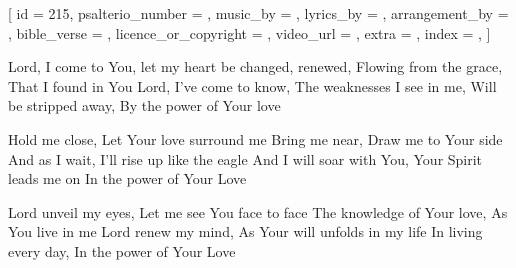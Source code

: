 
[
    id = {215},
    psalterio_number = {},
    music_by = {},
    lyrics_by = {},
    arrangement_by = {},
    bible_verse = {},
    licence_or_copyright = {},
    video_url = {},
    extra = {},
    index = {},
]


\beginverse
	
Lord, I come to You, let my heart be changed, renewed,
Flowing from the grace, 
That I found in You
Lord, I've come to know,
 The weaknesses I see in me,
Will be stripped away, 
By the power of Your love

\endverse


\beginchorus

Hold me close, 
Let Your love surround me
Bring me near, Draw me to Your side
And as I wait, I'll rise up like the eagle
And I will soar with You, 
Your Spirit leads me on
In the power of Your Love

\endchorus


\beginverse

\chordsoff
Lord unveil my eyes,
 Let me see You face to face
The knowledge of Your love, 
As You live in me
Lord renew my mind,
 As Your will unfolds in my life
In living every day, 
In the power of Your Love 
\chordson

\endverse





\endsong
